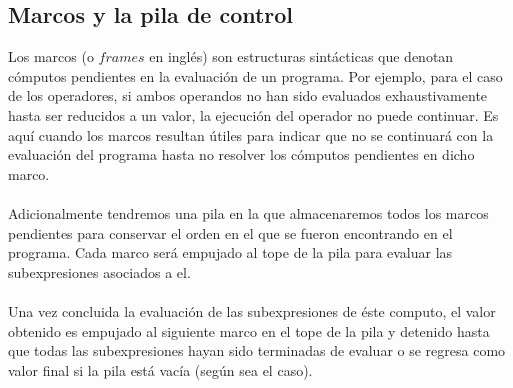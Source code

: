 \bigskip

 \subsection{Marcos y la pila de control}
  Los marcos (o $frames$ en inglés) son estructuras sintácticas que denotan cómputos pendientes en la evaluación de un programa. Por ejemplo, para el caso de los operadores, si ambos operandos no han sido evaluados exhaustivamente hasta ser reducidos a un valor, la ejecución del operador no puede continuar.
 Es aquí cuando los marcos resultan útiles para indicar que no se continuará con la evaluación del programa hasta no resolver los cómputos pendientes en dicho marco.\\\\
Adicionalmente tendremos una pila en la que almacenaremos todos los marcos pendientes para conservar el orden en el que se fueron encontrando en el programa.  Cada marco será empujado al tope de la pila para evaluar las subexpresiones asociados a el. \\\\
Una vez concluida la evaluación de las subexpresiones de éste computo, el valor obtenido es empujado al siguiente marco en el tope de la pila y detenido hasta que todas las subexpresiones hayan sido terminadas de evaluar o se regresa como valor final si la pila está vacía (según sea el caso). \\\\

